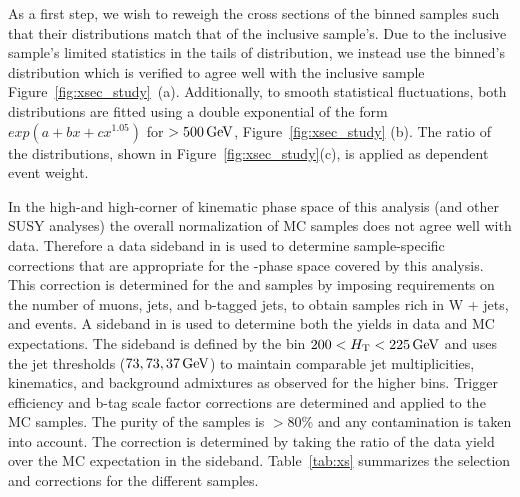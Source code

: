 
As a first step, we wish to reweigh the cross sections of the \partonht binned samples such that
their \partonht distributions match that of the inclusive sample's. Due to
the inclusive sample's limited statistics in the tails of \scalht distribution, 
we instead use the \nparton binned's \partonht distribution which is verified to agree well 
with the inclusive sample Figure~\ref{fig:xsec_study}~(a).  Additionally, to smooth statistical
fluctuations, both distributions are fitted using a double exponential of the form $exp(a+bx + cx^{1.05})$
for \scalht $> 500\,\text{Ge\hspace{-.08em}V}$, Figure~\ref{fig:xsec_study} (b). The ratio of the distributions,
shown in Figure~\ref{fig:xsec_study}(c), is applied as \partonht dependent event weight.

In the high-\scalht and high-\met corner of kinematic phase space of this analysis 
(and other SUSY analyses) the overall normalization of MC samples does not 
agree well with data. Therefore a data sideband in \scalht is used
to determine sample-specific corrections that are appropriate for the
\scalht-\met phase space covered by this analysis. This correction is determined 
for the \wlnu and \ttbar samples by imposing requirements on the number of muons, 
jets, and b-tagged jets, to obtain samples rich in W + jets, and \ttbar events.
A sideband in \scalht is used to determine both the yields in data and
MC expectations. The sideband is defined by the bin $200 < \mbox{$H_\text{T}$}
< 225\,\text{Ge\hspace{-.08em}V}$ and uses the jet \pt thresholds ($73,73,37\,\text{Ge\hspace{-.08em}V}$) to maintain 
comparable jet multiplicities, kinematics, and background admixtures as observed for the
higher \scalht bins. Trigger efficiency and b-tag scale factor corrections 
are determined and applied to the MC samples. The purity of the samples is $>80\%$ and
any contamination is taken into account. The correction is determined by 
taking the ratio of the data yield over the MC expectation in the sideband. 
Table~\ref{tab:xs} summarizes the selection and corrections for the different samples. 

